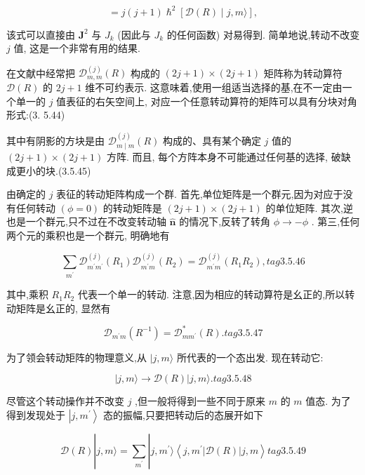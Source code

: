 $$
= j\left( {j + 1}\right) {\hslash }^{2}\left\lbrack {\mathcal{D}\left( R\right) \mid j, m\rangle }\right\rbrack ,
$$

该式可以直接由 ${\mathbf{J}}^{2}$ 与 ${J}_{k}$ (因此与 ${J}_{k}$ 的任何函数) 对易得到. 简单地说,转动不改变 $j$ 值, 这是一个非常有用的结果.

在文献中经常把 ${\mathcal{D}}_{m, m}^{\left( j\right) }\left( R\right)$ 构成的 $\left( {{2j} + 1}\right) \times \left( {{2j} + 1}\right)$ 矩阵称为转动算符 $\mathcal{D}\left( R\right)$ 的 ${2j} + 1$ 维不可约表示. 这意味着,使用一组适当选择的基,在不一定由一个单一的 $j$ 值表征的右矢空间上, 对应一个任意转动算符的矩阵可以具有分块对角形式:(3. 5.44)


其中有阴影的方块是由 ${\mathcal{D}}_{m \mid m}^{\left( j\right) }\left( R\right)$ 构成的、具有某个确定 $j$ 值的 $\left( {{2j} + 1}\right) \times \left( {{2j} + 1}\right)$ 方阵. 而且, 每个方阵本身不可能通过任何基的选择, 破缺成更小的块.(3.5.45)



由确定的 $j$ 表征的转动矩阵构成一个群. 首先,单位矩阵是一个群元,因为对应于没有任何转动 $\left( {\phi = 0}\right)$ 的转动矩阵是 $\left( {{2j} + 1}\right) \times \left( {{2j} + 1}\right)$ 的单位矩阵. 其次,逆也是一个群元,只不过在不改变转动轴 $\widehat{\mathbf{n}}$ 的情况下,反转了转角 $\phi \rightarrow - \phi$ . 第三,任何两个元的乘积也是一个群元, 明确地有

$$
\mathop{\sum }\limits_{{m}^{\prime }}{\mathcal{D}}_{{m}^{\prime }{m}^{\prime }}^{\left( j\right) }\left( {R}_{1}\right) {\mathcal{D}}_{{m}^{\prime }m}^{\left( j\right) }\left( {R}_{2}\right) = {\mathcal{D}}_{{m}^{\prime }m}^{\left( j\right) }\left( {{R}_{1}{R}_{2}}\right) , tag{3. 5.46}
$$

其中,乘积 ${R}_{1}{R}_{2}$ 代表一个单一的转动. 注意,因为相应的转动算符是幺正的,所以转动矩阵是幺正的, 显然有

$$
{\mathcal{D}}_{{m}^{\prime }m}\left( {R}^{-1}\right) = {\mathcal{D}}_{m{m}^{\prime }}^{ * }\left( R\right) . tag{3.5.47}
$$

为了领会转动矩阵的物理意义,从 $|j, m\rangle$ 所代表的一个态出发. 现在转动它:

$$
\left| {j, m\rangle \rightarrow \mathcal{D}\left( R\right) }\right| j, m\rangle . tag{3. 5.48}
$$

尽管这个转动操作并不改变 $j$ ,但一般将得到一些不同于原来 $m$ 的 $m$ 值态. 为了得到发现处于 $\left| {j,{m}^{\prime }}\right\rangle$ 态的振幅,只要把转动后的态展开如下

$$
\mathcal{D}\left( R\right) \left| {j, m\rangle = \mathop{\sum }\limits_{{m}^{\prime }}}\right| j,{m}^{\prime }\rangle \left\langle {j,{m}^{\prime }\left| {\mathcal{D}\left( R\right) }\right| j, m}\right\rangle tag{3. 5.49}
$$

